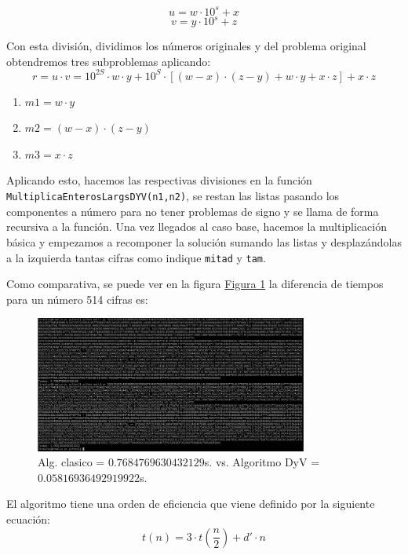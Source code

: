 \documentclass[10pt,a4paper,spanish]{report}
\theoremstyle{definition}
\theoremstyle{remark}
\begin{document}
\begin{center}
  
  $$u = w \cdot 10^s + x$$
  $$v = y \cdot 10^s + z$$
\end{center}

Con esta división, dividimos los números originales y del problema original obtendremos tres subproblemas aplicando:
\begin{displaymath}
  r = u \cdot v = 10^{2S}\cdot w \cdot y + 10^S \cdot \left[(w - x) \cdot (z-y) + w\cdot y + x\cdot z\right] + x\cdot z
\end{displaymath}


\begin{enumerate}[---]
  \item $m1=w\cdot y$
  \item $m2=(w-x) \cdot (z-y)$
  \item $m3=x\cdot z$
\end{enumerate}

Aplicando esto, hacemos las respectivas divisiones en la función \verb*|MultiplicaEnterosLargsDYV(n1,n2)|, se restan las listas pasando los componentes a número para no tener problemas de signo y se llama de forma recursiva a la función. Una vez llegados al caso base, hacemos la multiplicación básica y empezamos a recomponer la solución sumando las listas y desplazándolas a la izquierda tantas cifras como indique \verb|mitad| y \verb|tam|.

Como comparativa, se puede ver en la figura \hyperref[comparativa]{Figura \ref*{comparativa}} la diferencia de tiempos para un número 514 cifras es:
\begin{center}
\begin{figure}[!h]
\centering
\includegraphics[width=0.8\textwidth]{figura1}
\caption{Alg. clasico = $0.7684769630432129$s. vs. Algoritmo DyV = $0.05816936492919922$s.}
\label{comparativa}
\end{figure}
\end{center}

El algoritmo tiene una orden de eficiencia que viene definido por la siguiente ecuación:
\begin{displaymath}
  t(n) = 3 \cdot t\left(\frac{n}{2}\right)+d'\cdot n
\end{displaymath}
\end{document}
